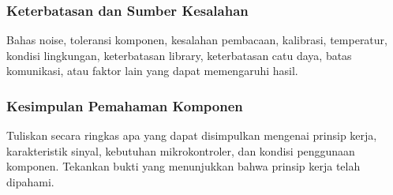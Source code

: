 \subsubsection{Keterbatasan dan Sumber Kesalahan}
Bahas noise, toleransi komponen, kesalahan pembacaan, kalibrasi, temperatur,
kondisi lingkungan, keterbatasan library, keterbatasan catu daya, batas
komunikasi, atau faktor lain yang dapat memengaruhi hasil.

\subsubsection{Kesimpulan Pemahaman Komponen}
Tuliskan secara ringkas apa yang dapat disimpulkan mengenai prinsip kerja,
karakteristik sinyal, kebutuhan mikrokontroler, dan kondisi penggunaan
komponen. Tekankan bukti yang menunjukkan bahwa prinsip kerja telah dipahami.
